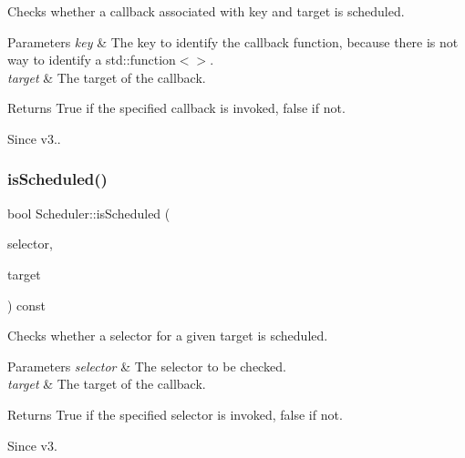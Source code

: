 Checks whether a callback associated with \textquotesingle{}key\textquotesingle{} and \textquotesingle{}target\textquotesingle{} is scheduled. 
\begin{DoxyParams}{Parameters}
{\em key} & The key to identify the callback function, because there is not way to identify a std\+::function$<$$>$. \\
\hline
{\em target} & The target of the callback. \\
\hline
\end{DoxyParams}
\begin{DoxyReturn}{Returns}
True if the specified callback is invoked, false if not. 
\end{DoxyReturn}
\begin{DoxySince}{Since}
v3.. 
\end{DoxySince}
\mbox{\label{classScheduler_aa43205eb0e74dd43834705a45e4fbdf1}} 
\subsubsection{\texorpdfstring{is\+Scheduled()}{isScheduled()}\hspace{0.1cm}{\footnotesize\ttfamily [3/4]}}
{\footnotesize\ttfamily bool Scheduler\+::is\+Scheduled (\begin{DoxyParamCaption}\item[{S\+E\+L\+\_\+\+S\+C\+H\+E\+D\+U\+LE}]{selector,  }\item[{const \hyperlink{classRef}{Ref} $\ast$}]{target }\end{DoxyParamCaption}) const}

Checks whether a selector for a given target is scheduled. 
\begin{DoxyParams}{Parameters}
{\em selector} & The selector to be checked. \\
\hline
{\em target} & The target of the callback. \\
\hline
\end{DoxyParams}
\begin{DoxyReturn}{Returns}
True if the specified selector is invoked, false if not. 
\end{DoxyReturn}
\begin{DoxySince}{Since}
v3. 
\end{DoxySince}
\mbox{\label{classScheduler_a95ed753a2875e2635b5120cee5c3e432}} 
